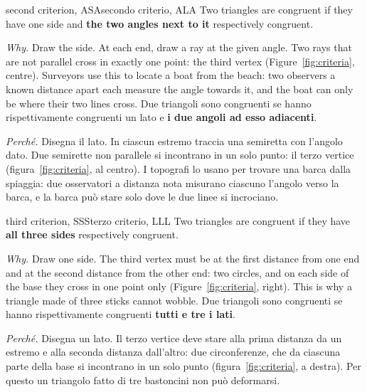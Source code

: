 \documentclass[10pt,a4paper,oneside]{book}
\begin{document}
\begin{defn}{second criterion, ASA}{secondo criterio, ALA}
Two triangles are congruent if they have one side and \textbf{the two angles next to it} respectively congruent.

\emph{Why.} Draw the side. At each end, draw a ray at the given angle. Two rays that are not parallel cross in exactly one point: the third vertex (Figure~\ref{fig:criteria}, centre). Surveyors use this to locate a boat from the beach: two observers a known distance apart each measure the angle towards it, and the boat can only be where their two lines cross.
\tcblower
Due triangoli sono congruenti se hanno rispettivamente congruenti un lato e \textbf{i due angoli ad esso adiacenti}.

\emph{Perché.} Disegna il lato. In ciascun estremo traccia una semiretta con l'angolo dato. Due semirette non parallele si incontrano in un solo punto: il terzo vertice (figura~\ref{fig:criteria}, al centro). I topografi lo usano per trovare una barca dalla spiaggia: due osservatori a distanza nota misurano ciascuno l'angolo verso la barca, e la barca può stare solo dove le due linee si incrociano.
\end{defn}

\begin{defn}{third criterion, SSS}{terzo criterio, LLL}
Two triangles are congruent if they have \textbf{all three sides} respectively congruent.

\emph{Why.} Draw one side. The third vertex must be at the first distance from one end and at the second distance from the other end: two circles, and on each side of the base they cross in one point only (Figure~\ref{fig:criteria}, right). This is why a triangle made of three sticks cannot wobble.
\tcblower
Due triangoli sono congruenti se hanno rispettivamente congruenti \textbf{tutti e tre i lati}.

\emph{Perché.} Disegna un lato. Il terzo vertice deve stare alla prima distanza da un estremo e alla seconda distanza dall'altro: due circonferenze, che da ciascuna parte della base si incontrano in un solo punto (figura~\ref{fig:criteria}, a destra). Per questo un triangolo fatto di tre bastoncini non può deformarsi.
\end{defn}
\end{document}
